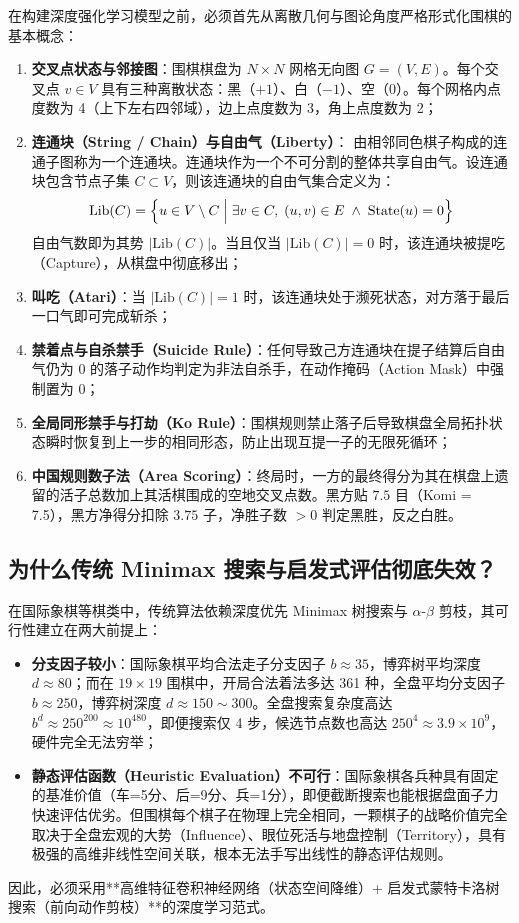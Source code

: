 \documentclass[11pt,a4paper]{ctexart}
\begin{document}
在构建深度强化学习模型之前，必须首先从离散几何与图论角度严格形式化围棋的基本概念：
\begin{enumerate}
  \item \textbf{交叉点状态与邻接图}：围棋棋盘为 $N \times N$ 网格无向图 $G=(V, E)$。每个交叉点 $v \in V$ 具有三种离散状态：黑（$+1$）、白（$-1$）、空（$0$）。每个网格内点度数为 4（上下左右四邻域），边上点度数为 3，角上点度数为 2；
  \item \textbf{连通块（String / Chain）与自由气（Liberty）}：
  由相邻同色棋子构成的连通子图称为一个连通块。连通块作为一个不可分割的整体共享自由气。设连通块包含节点子集 $C \subset V$，则该连通块的自由气集合定义为：
  \begin{equation}
  \mathrm{Lib}(C) = \Bigl\{ u \in V \setminus C \;\Big|\; \exists v \in C, \; (u, v) \in E \;\land\; \mathrm{State}(u) = 0 \Bigr\}
  \end{equation}
  自由气数即为其势 $|\mathrm{Lib}(C)|$。当且仅当 $|\mathrm{Lib}(C)| = 0$ 时，该连通块被提吃（Capture），从棋盘中彻底移出；
  \item \textbf{叫吃（Atari）}：当 $|\mathrm{Lib}(C)| = 1$ 时，该连通块处于濒死状态，对方落于最后一口气即可完成斩杀；
  \item \textbf{禁着点与自杀禁手（Suicide Rule）}：任何导致己方连通块在提子结算后自由气仍为 0 的落子动作均判定为非法自杀手，在动作掩码（Action Mask）中强制置为 0；
  \item \textbf{全局同形禁手与打劫（Ko Rule）}：围棋规则禁止落子后导致棋盘全局拓扑状态瞬时恢复到上一步的相同形态，防止出现互提一子的无限死循环；
  \item \textbf{中国规则数子法（Area Scoring）}：终局时，一方的最终得分为其在棋盘上遗留的活子总数加上其活棋围成的空地交叉点数。黑方贴 $7.5$ 目（Komi = 7.5），黑方净得分扣除 $3.75$ 子，净胜子数 $>0$ 判定黑胜，反之白胜。
\end{enumerate}

\subsection{为什么传统 Minimax 搜索与启发式评估彻底失效？}

在国际象棋等棋类中，传统算法依赖深度优先 Minimax 树搜索与 $\alpha$-$\beta$ 剪枝，其可行性建立在两大前提上：
\begin{itemize}
  \item \textbf{分支因子较小}：国际象棋平均合法走子分支因子 $b \approx 35$，博弈树平均深度 $d \approx 80$；而在 $19\times19$ 围棋中，开局合法着法多达 361 种，全盘平均分支因子 $b \approx 250$，博弈树深度 $d \approx 150 \sim 300$。全盘搜索复杂度高达 $b^d \approx 250^{200} \approx 10^{480}$，即便搜索仅 4 步，候选节点数也高达 $250^4 \approx 3.9 \times 10^9$，硬件完全无法穷举；
  \item \textbf{静态评估函数（Heuristic Evaluation）不可行}：国际象棋各兵种具有固定的基准价值（车=5分、后=9分、兵=1分），即便截断搜索也能根据盘面子力快速评估优劣。但围棋每个棋子在物理上完全相同，一颗棋子的战略价值完全取决于全盘宏观的大势（Influence）、眼位死活与地盘控制（Territory），具有极强的高维非线性空间关联，根本无法手写出线性的静态评估规则。
\end{itemize}
因此，必须采用**高维特征卷积神经网络（状态空间降维）+ 启发式蒙特卡洛树搜索（前向动作剪枝）**的深度学习范式。
\end{document}
